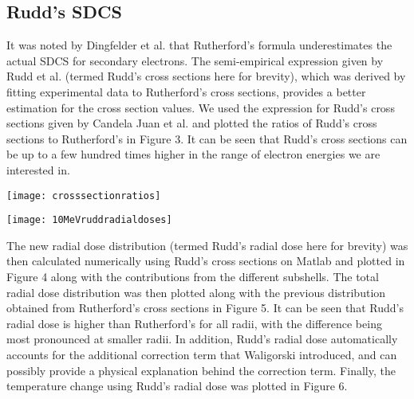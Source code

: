 \documentclass{article}
\begin{document}
\begin{multicols}{2}

\section {Rudd's SDCS}
 
\indent It was noted by Dingfelder et al. \cite{dingfelder} that Rutherford's formula underestimates the actual SDCS for secondary electrons. 
The semi-empirical expression given by Rudd et al. (termed Rudd's cross sections here for brevity), which was derived by fitting experimental data to Rutherford's cross sections, provides a better estimation for the cross section values. We used the expression for Rudd's cross sections given by Candela Juan et al. \cite{candela} and plotted the ratios of Rudd's cross sections to Rutherford's in Figure 3. It can be seen that Rudd's cross sections can be up to a few hundred times higher in the range of electron energies we are interested in. 
%
\begin{center}
\texttt{[image: crosssectionratios]}
\captionsetup[figure]{format=hang,font=small}
\label{fig3}
\end{center}
\begin{center}
\texttt{[image: 10MeVruddradialdoses]}
\captionsetup[figure]{format=hang,font=small}
\label{fig4}
\end{center}
\indent The new radial dose distribution (termed Rudd's radial dose here for brevity) was then calculated numerically using Rudd's cross sections on Matlab and plotted in Figure 4 along with the contributions from the different subshells. The total radial dose distribution was then plotted along with the previous distribution obtained from Rutherford's cross sections in Figure 5. It can be seen that Rudd's radial dose is higher than Rutherford's for all radii, with the difference being most pronounced at smaller radii. In addition, Rudd's radial dose automatically accounts for the additional correction term that Waligorski introduced, and can possibly provide a physical explanation behind the correction term. Finally, the temperature change using Rudd's radial dose was plotted in Figure 6. 

\end{multicols}
\end{document}
